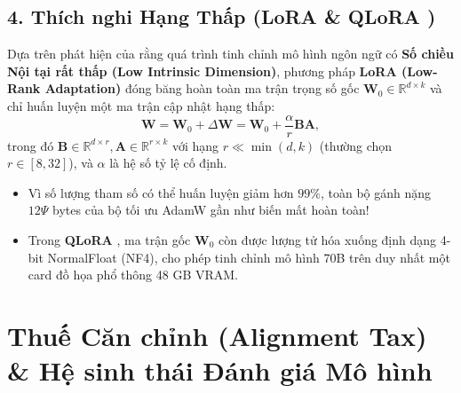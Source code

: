 \subsection{4. Thích nghi Hạng Thấp (LoRA \& QLoRA \citealt{hu2022lora, dettmers2023qlora})}
Dựa trên phát hiện của \citet{aghajanyan2021intrinsic} rằng quá trình tinh chỉnh mô hình ngôn ngữ có \textbf{Số chiều Nội tại rất thấp (Low Intrinsic Dimension)}, phương pháp \textbf{LoRA (Low-Rank Adaptation)} \citep{hu2022lora} đóng băng hoàn toàn ma trận trọng số gốc $\mathbf{W}_0 \in \mathbb{R}^{d \times k}$ và chỉ huấn luyện một ma trận cập nhật hạng thấp:
\begin{equation}
    \mathbf{W} = \mathbf{W}_0 + \Delta \mathbf{W} = \mathbf{W}_0 + \frac{\alpha}{r} \mathbf{B}\mathbf{A},
    \label{eq:lora_formula}
\end{equation}
trong đó $\mathbf{B} \in \mathbb{R}^{d \times r}, \mathbf{A} \in \mathbb{R}^{r \times k}$ với hạng $r \ll \min(d, k)$ (thường chọn $r \in [8, 32]$), và $\alpha$ là hệ số tỷ lệ cố định.
\begin{itemize}[leftmargin=1.2cm]
    \item Vì số lượng tham số có thể huấn luyện giảm hơn $99\%$, toàn bộ gánh nặng $12\Psi$ bytes của bộ tối ưu AdamW gần như biến mất hoàn toàn!
    \item Trong \textbf{QLoRA} \citep{dettmers2023qlora}, ma trận gốc $\mathbf{W}_0$ còn được lượng tử hóa xuống định dạng 4-bit NormalFloat (NF4), cho phép tinh chỉnh mô hình 70B trên duy nhất một card đồ họa phổ thông 48 GB VRAM.
\end{itemize}

\section{Thuế Căn chỉnh (Alignment Tax) \& Hệ sinh thái Đánh giá Mô hình}
\label{sec:evaluation_ecosystem}

